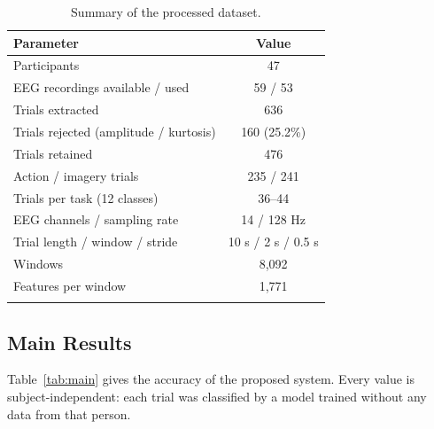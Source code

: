 \documentclass[pdflatex,sn-mathphys-num]{sn-jnl}%
\theoremstyle{thmstyleone}%
\theoremstyle{thmstyletwo}%
\theoremstyle{thmstylethree}%
\begin{document}
\begin{table}[htbp]
\centering
\caption{Summary of the processed dataset.}
\label{tab:dataset}
\begin{tabular}{@{}lc@{}}
\toprule
Parameter & Value \\
\midrule
Participants & 47 \\
EEG recordings available / used & 59 / 53 \\
Trials extracted & 636 \\
Trials rejected (amplitude / kurtosis) & 160 (25.2\%) \\
Trials retained & 476 \\
Action / imagery trials & 235 / 241 \\
Trials per task (12 classes) & 36--44 \\
EEG channels / sampling rate & 14 / 128 Hz \\
Trial length / window / stride & 10 s / 2 s / 0.5 s \\
Windows & 8,092 \\
Features per window & 1,771 \\
\botrule
\end{tabular}
\end{table}

\subsection{Main Results}\label{subsec:main}

Table~\ref{tab:main} gives the accuracy of the proposed system. Every value is subject-independent: each trial was classified by a model trained without any data from that person.

\begin{table}[htbp]
\centering
\caption{Accuracy of the proposed ensemble with mirror augmentation (person-wise GroupKFold). Pooled = correctly classified test trials over all folds. $^\dagger$Not significant under nested cross-validation (52.28\%, Section~\ref{subsec:lrresults}).}
\label{tab:main}
\end{table}
\end{document}
